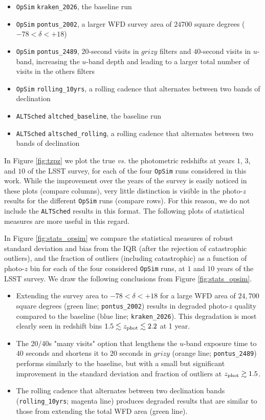 \begin{itemize}
\item {\tt OpSim} {\tt kraken\_2026}, the baseline run
\item {\tt OpSim} {\tt pontus\_2002}, a larger WFD survey area of $24700$ square degrees ($-78 < \delta < +18$)
\item {\tt OpSim} {\tt pontus\_2489}, $20$-second visits in $grizy$ filters and $40$-second visits in $u$-band, increasing the $u$-band depth and leading to a larger total number of visits in the others filters
\item {\tt OpSim} {\tt rolling_10yrs}, a rolling cadence that alternates between two bands of declination
\item {\tt ALTSched} {\tt altched\_baseline}, the baseline run
\item {\tt ALTSched} {\tt altsched\_rolling}, a rolling cadence that alternates between two bands of declination
\end{itemize}

In Figure \ref{fig:tzpz} we plot the true {\it vs.} the photometric redshifts at years $1$, $3$, and $10$ of the LSST survey, for each of the four {\tt OpSim} runs considered in this work. While the improvement over the years of the survey is easily noticed in these plots (compare columns), very little distinction is visible in the photo-$z$ results for the different {\tt OpSim} runs (compare rows). For this reason, we do not include the {\tt ALTSched} results in this format. The following plots of statistical measures are more useful in this regard.

In Figure \ref{fig:stats_opsim} we compare the statistical measures of robust standard deviation and bias from the IQR (after the rejection of catastrophic outliers), and the fraction of outliers (including catastrophic) as a function of photo-$z$ bin for each of the four considered {\tt OpSim} runs, at $1$ and $10$ years of the LSST survey. We draw the following conclusions from Figure \ref{fig:stats_opsim}. 
\begin{itemize}
\item Extending the survey area to $-78 < \delta < +18$ for a large WFD area of $24,700$ square degrees (green line; {\tt pontus\_2002}) results in degraded photo-$z$ quality compared to the baseline (blue line; {\tt kraken\_2026}). This degradation is most clearly seen in redshift bins $1.5 \lesssim z_{\rm phot} \lesssim 2.2$ at 1 year.
\item The 20/40s "many visits" option that lengthens the $u$-band exposure time to $40$ seconds and shortens it to $20$ seconds in $grizy$ (orange line; {\tt pontus\_2489}) performs similarly to the baseline, but with a small but significant improvement in the standard deviation and fraction of outliers at $z_{\rm phot} \gtrsim 1.5$.
\item The rolling cadence that alternates between two declination bands ({\tt rolling\_10yrs}; magenta line) produces degraded results that are similar to those from extending the total WFD area (green line).
\end{itemize}

